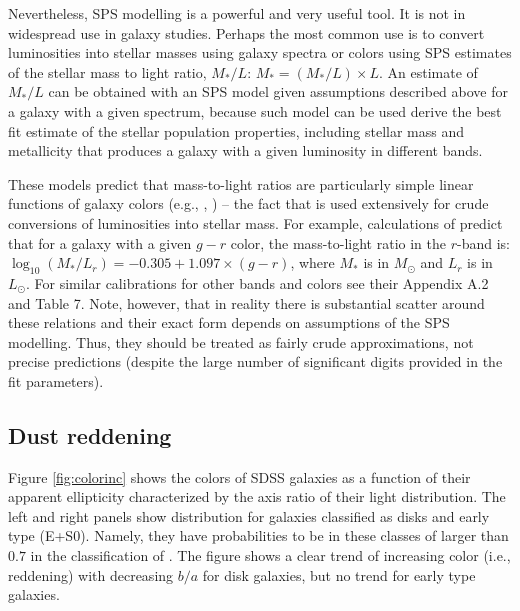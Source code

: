 Nevertheless, SPS modelling is a powerful and very useful tool. It is not in widespread use in galaxy studies. Perhaps the most common use is to convert luminosities into stellar masses using galaxy spectra or colors using SPS estimates of the stellar mass to light ratio, $M_*/L$: $M_*=(M_*/L)\times L$.  
An estimate of $M_*/L$ can be obtained with an SPS model given assumptions described above for a galaxy with a given spectrum, because such model can be used derive the best fit estimate of the stellar population properties, including stellar mass and metallicity that produces a galaxy with a given luminosity in different bands. 

These models predict that mass-to-light ratios are particularly simple linear functions of galaxy colors (e.g., \href{http://adsabs.harvard.edu/abs/2003ApJS..149..289B}{\citealt{bell_etal03}}, \href{http://adsabs.harvard.edu/abs/2009MNRAS.400.1181Z}{\citealt{zibetti_etal09}}) -- the fact that is used extensively for crude conversions of luminosities into stellar mass. For example, calculations of \href{http://adsabs.harvard.edu/abs/2003ApJS..149..289B}{\citet{bell_etal03}} predict that for a galaxy with a given $g-r$ color, the mass-to-light ratio in the $r$-band is: $\log_{10}(M_*/L_r)=-0.305+1.097\times (g-r)$, where $M_*$ is in $M_\odot$ and $L_r$ is in $L_\odot$. For similar calibrations for other bands and colors see their Appendix A.2 and Table 7. Note, however, that in reality there is substantial scatter around these relations and their exact form depends on assumptions of the SPS modelling. Thus, they should be treated as fairly crude approximations, not precise predictions (despite the large number of significant digits provided in the fit parameters).

\subsection{Dust reddening}

Figure \ref{fig:colorinc} shows the colors of SDSS galaxies as a function of their apparent ellipticity characterized by the axis ratio of their light distribution. The left and right panels show distribution for galaxies classified as disks and early type (E+S0). Namely, they have probabilities to be in these classes of larger than $0.7$ in the classification of  \href{http://www.aanda.org/articles/aa/abs/2011/01/aa15735-10/aa15735-10.html}{\citet{huertas_company_etal11}}. The figure shows a clear trend of increasing color (i.e., reddening) with decreasing $b/a$ for disk galaxies, but no trend for early type galaxies. 

